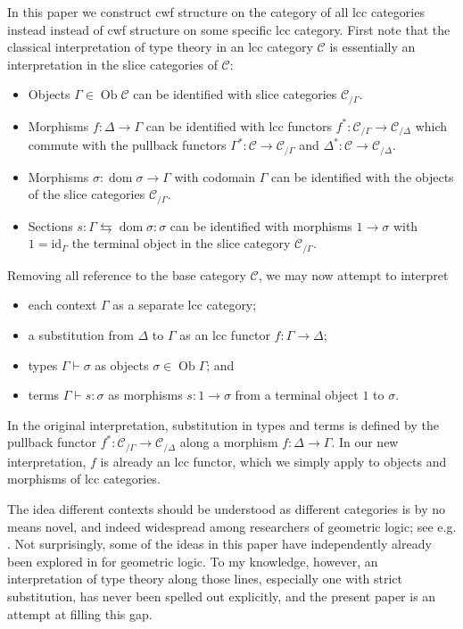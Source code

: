 \documentclass[a4paper]{article}
\theoremstyle{remark}
\theoremstyle{definition}
\begin{document}
In this paper we construct cwf structure on the category of all lcc categories instead instead of cwf structure on some specific lcc category.
First note that the classical interpretation of type theory in an lcc category $\mathcal{C}$ is essentially an interpretation in the slice categories of $\mathcal{C}$:
\begin{itemize}
  \item
    Objects $\Gamma \in \operatorname{Ob} \mathcal{C}$ can be identified with slice categories $\mathcal{C}_{/ \Gamma}$.
  \item
    Morphisms $f : \Delta \rightarrow \Gamma$ can be identified with lcc functors $f^* : \mathcal{C}_{/ \Gamma} \rightarrow \mathcal{C}_{/ \Delta}$ which commute with the pullback functors $\Gamma^* : \mathcal{C} \rightarrow \mathcal{C}_{/ \Gamma}$ and $\Delta^* : \mathcal{C} \rightarrow \mathcal{C}_{/ \Delta}$.
  \item
    Morphisms $\sigma : \operatorname{dom} \sigma \rightarrow \Gamma$ with codomain $\Gamma$ can be identified with the objects of the slice categories $\mathcal{C}_{/ \Gamma}$.
  \item
    Sections $s : \Gamma \leftrightarrows \operatorname{dom} \sigma : \sigma$ can be identified with morphisms $1 \rightarrow \sigma$ with $1 = \mathrm{id}_\Gamma$ the terminal object in the slice category $\mathcal{C}_{/ \Gamma}$.
\end{itemize}
Removing all reference to the base category $\mathcal{C}$, we may now attempt to interpret
\begin{itemize}
  \item
    each context $\Gamma$ as a separate lcc category;
  \item
    a substitution from $\Delta$ to $\Gamma$ as an lcc functor $f : \Gamma \rightarrow \Delta$;
  \item
    types $\Gamma \vdash \sigma$ as objects $\sigma \in \operatorname{Ob} \Gamma$; and
  \item
    terms $\Gamma \vdash s : \sigma$ as morphisms $s : 1 \rightarrow \sigma$ from a terminal object $1$ to $\sigma$.
\end{itemize}
In the original interpretation, substitution in types and terms is defined by the pullback functor $f^* : \mathcal{C}_{/ \Gamma} \rightarrow \mathcal{C}_{/ \Delta}$ along a morphism $f : \Delta \rightarrow \Gamma$.
In our new interpretation, $f$ is already an lcc functor, which we simply apply to objects and morphisms of lcc categories.

The idea different contexts should be understood as different categories is by no means novel, and indeed widespread among researchers of geometric logic; see e.g. \cite[section 4.5]{locales-and-toposes-as-spaces}.
Not surprisingly, some of the ideas in this paper have independently already been explored in \cite{au-sketches} for geometric logic.
To my knowledge, however, an interpretation of type theory along those lines, especially one with strict substitution, has never been spelled out explicitly, and the present paper is an attempt at filling this gap.
\end{document}

